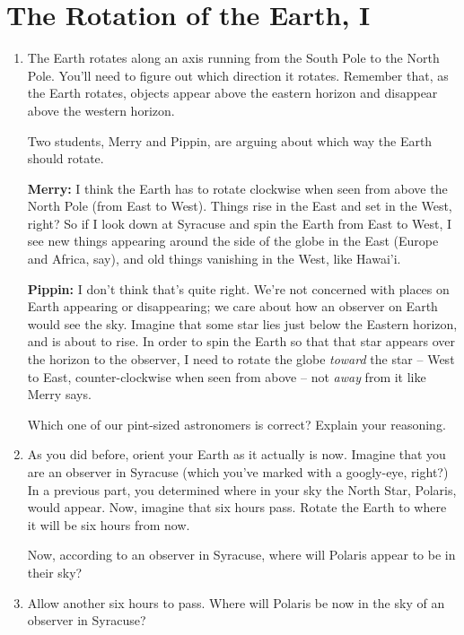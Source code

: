 \documentclass[12pt]{article}
\begin{document}
\section{The Rotation of the Earth, I}

\begin{enumerate}
\item The Earth rotates along an axis running from the South Pole to the North Pole. You'll need to figure out which
direction it rotates. Remember that, as the Earth rotates, objects appear above the eastern horizon and disappear above the
western horizon.

Two students, Merry and Pippin, are arguing about which way the Earth should rotate.

{\bf Merry:} I think the Earth has to rotate clockwise when seen from above the North Pole (from East to West). Things rise in 
the East and set in the West, right? So if I look down at Syracuse and spin the Earth from East to West, I see new things 
appearing around the side of the globe in the East (Europe and Africa, say), and old things vanishing in the West, like Hawai'i.

{\bf Pippin:} I don't think that's quite right. We're not concerned with places on Earth appearing or disappearing; we care about 
how an observer on Earth would see the sky. Imagine that some star lies just below the Eastern horizon, and is about to 
rise. In order to spin the Earth so that that star appears over the horizon to the observer, I need to rotate the globe {\it 
toward} the star -- West to East, counter-clockwise when seen from above -- not {\it away} from it like Merry says.

Which one of our pint-sized astronomers is correct? Explain your reasoning.

\vspace{1.5in}

\item As you did before, orient your Earth as it actually is now. 
Imagine that you are an observer in Syracuse (which you've marked with a googly-eye, right?) In a previous part, you 
determined where in your sky the North Star, Polaris, would appear. Now, imagine that six hours pass. Rotate the Earth to
where it will be six hours from now.

Now, according to an observer in Syracuse, where will Polaris appear to be in their sky?

\vspace{1in}

\item Allow another six hours to pass. Where will Polaris be now in the sky of an observer in Syracuse?


\end{enumerate}
\end{document}
